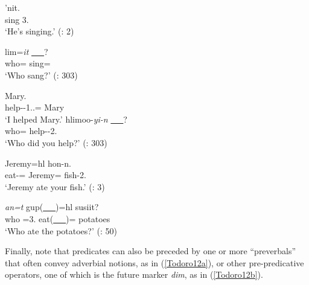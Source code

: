 \documentclass[output=paper]{langscibook}
\begin{document}
\begin{exe}
\ex \label{Todoro9}
\begin{xlist}

\ex \label{Todoro9a}
 {'nit.} \\
    sing 3.{\seriesIII} \\
\glt `He's singing.' (\citealt{forbes2017a}: 2)

\ex \label{Todoro9b}
 {lim=\textit{it}} \uline{~~~}? \\
    who={\cn} sing={\sx} \\
\glt `Who sang?' (\citealt{rigsby1986a}: 303)

\end{xlist}

\ex \label{Todoro10}
\begin{xlist}

\ex \label{Todoro10a}
 Mary. \\
    help-{\tr}-1.{\sg}.{\seriesII}={\pn} Mary \\
\glt `I helped Mary.'  
\ex \label{Todoro10b}
 {hlimoo-\textit{yi-n}} \uline{~~~}?\\
    who={\cn} help-{\tr}-2{\sg}.{\seriesII} \\
\glt `Who did you help?' (\citealt{rigsby1986a}: 303) 

\end{xlist}

\ex \label{Todoro11}
\begin{xlist}

\ex \label{Todoro11a}
 {Jeremy=hl} {hon-n.} \\
    eat-{\tr}={\cn} Jeremy={\cn} fish-2{\sg}.{\seriesII}\\
\glt `Jeremy ate your fish.' (\citealt{forbes2017a}: 3)

\ex \label{Todoro11b}
 {\textit{an=t}} {gup(\uline{~~~})=hl} {susiit}? \\
    who {\ax}=3.{\seriesI} eat(\uline{~~~})={\cn} potatoes\\
\glt `Who ate the potatoes?' (\citealt{davis2011a}: 50) 

\end{xlist}
\end{exe}

Finally, note that predicates can also be preceded by one or more ``preverbals'' that often convey adverbial notions, as in (\ref{Todoro12a}), or other pre-predicative operators, one of which is the future marker \emph{dim}, as in (\ref{Todoro12b}).
\end{document}
